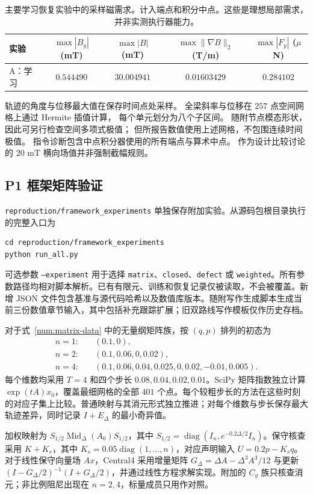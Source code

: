 \begin{table}[t]
\centering
\caption{主要学习恢复实验中的采样磁需求。计入端点和积分中点。这些是理想局部需求，并非实测执行器能力。}
\label{sx:port-table}
\begin{tabular}{lcccc}
\toprule
实验 & $\max|B_y|$ (mT) & $\max|B|$ (mT) & $\max\|\nabla B\|_2$ (T/m) & $\max|F_y|$ ($\mu$N)\\
\midrule
A：学习 & $0.544490$ & $30.004941$ & $0.01603429$ & $0.284102$ \\
\bottomrule
\end{tabular}
\end{table}

轨迹的角度与位移最大值在保存时间点处采样。
全梁斜率与位移在 $257$ 点空间网格上通过 Hermite 插值计算，
每个单元划分为八个子区间。
随附节点模态形状，因此可另行检查空间多项式极值；
但所报告数值使用上述网格，不包围连续时间极值。
指令诊断包含中点积分器使用的所有端点与算术中点。
作为设计比较讨论的 $20$ mT 横向场值并非强制截幅规则。

\subsection{P1 框架矩阵验证}
\label{sx:framework-matrix}
\texttt{reproduction/framework\_experiments} 单独保存附加实验。从源码包根目录执行的完整入口为
\begin{verbatim}
cd reproduction/framework_experiments
python run_all.py
\end{verbatim}
可选参数 \texttt{--experiment} 用于选择 \texttt{matrix}、\texttt{closed}、\texttt{defect} 或 \texttt{weighted}。所有参数路径均相对脚本解析。已有有限元、训练和恢复记录仅被读取，不会被覆盖。新增 JSON 文件包含基准与源代码哈希以及数值库版本。随附写作生成脚本生成当前三份数值章节输入，其中包括补充跟踪扩展；旧双路线写作模板仅作历史存档。

对于式~\eqref{num:matrix-data} 中的无量纲矩阵族，按 $(q,p)$ 排列的初态为
\begin{align*}
 n=1:&\quad (0.1,0),\\
 n=2:&\quad (0.1,0.06,0,0.02),\\
 n=4:&\quad (0.1,0.06,0.04,0.025,0,0.02,-0.01,0.005).
\end{align*}
每个维数均采用 $T=4$ 和四个步长 $0.08,0.04,0.02,0.01$。SciPy 矩阵指数独立计算 $\exp(tA)x_0$，覆盖最细网格的全部 $401$ 个点。每个较粗步长的方法在这些时刻的对应子集上比较。普通映射与其消元形式独立推进；对每个维数与步长保存最大轨迹差异，同时记录 $I+E_\Delta$ 的最小奇异值。

加权映射为 $S_{1/2}\operatorname{Mid}_\Delta(A_0)S_{1/2}$，其中 $S_{1/2}=\operatorname{diag}(I_n,e^{-0.2\Delta/2}I_n)$。保守核查采用 $K+K_s$，其中 $K_s=0.05\operatorname{diag}(1,\ldots,n)$，对应声明输入 $U=0.2p-K_sq$。对于线性保守向量场 $Ax$，Central4 采用增量矩阵 $G_\Delta=\Delta A-\Delta^3A^3/12$ 与更新 $(I-G_\Delta/2)^{-1}(I+G_\Delta/2)$，并通过线性方程求解实现。附加的 $C_g$ 族只核查消元；非比例阻尼出现在 $n=2,4$，标量成员只用作对照。

